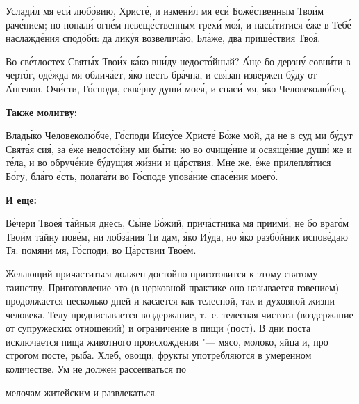    Услади́л мя еси́ любо́вию, Христе́, и измени́л мя еси́ Боже́ственным
Твои́м раче́нием; но попали́ огне́м невеще́ственным грехи́ моя́, и насы́титися
е́же в Тебе́ наслажде́ния сподо́би: да лику́я возвелича́ю, Бла́же, два
прише́ствия Твоя́.


   Во све́тлостех Святы́х Твои́х ка́ко вни́ду недосто́йный? А́ще бо дерзну́
совни́ти в черто́г, оде́жда мя облича́ет, я́ко несть бра́чна, и свя́зан изве́ржен
бу́ду от А́нгелов. Очи́сти, Го́споди, скве́рну души́ моея́, и спаси́ мя, я́ко
Человеколю́бец.



 

\bfseries Также молитву:\normalfont{}


   Влады́ко Человеколю́бче, Го́споди Иису́се Христе́ Бо́же мой, да не в суд
ми бу́дут Свята́я сия́, за е́же недосто́йну ми бы́ти: но во очище́ние и
освяще́ние души́ же и те́ла, и во обруче́ние бу́дущия жи́зни и ца́рствия. Мне
же, е́же прилепля́тися Бо́гу, бла́го е́сть, полага́ти во Го́споде упова́ние
спасе́ния моего́.



 

\bfseries И еще:\normalfont{}


   Ве́чери Твоея́ та́йныя днесь, Сы́не Бо́жий, прича́стника мя приими́;
не бо враго́м Твои́м та́йну пове́м, ни лобза́ния Ти дам, я́ко Иу́да,
но я́ко разбо́йник испове́даю Тя: помяни́ мя, Го́споди, во Ца́рствии
Твое́м.
   


   Желающий причаститься должен достойно приготовится к этому
святому таинству. Приготовление это (в церковной практике оно называется
говением) продолжается несколько дней и касается как телесной, так и
духовной жизни человека. Телу предписывается воздержание, т. е. телесная
чистота (воздержание от супружеских отношений) и ограничение в пищи
(пост). В дни поста исключается пища животного происхождения "---
мясо, молоко, яйца и, про строгом посте, рыба. Хлеб, овощи, фрукты
употребляются в умеренном количестве. Ум не должен рассеиваться по

мелочам житейским и развлекаться.


